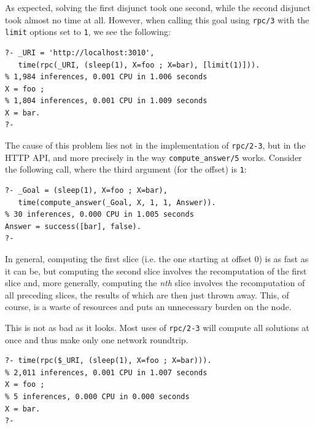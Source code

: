 \noindent As expected, solving the first disjunct took one second, while the second disjunct took almost no time at all. However, when calling this goal using \texttt{rpc/3} with the \texttt{limit} options set to \texttt{1}, we see the following:

\begin{verbatim}
?- _URI = 'http://localhost:3010',
   time(rpc(_URI, (sleep(1), X=foo ; X=bar), [limit(1)])).
% 1,984 inferences, 0.001 CPU in 1.006 seconds
X = foo ;
% 1,804 inferences, 0.001 CPU in 1.009 seconds
X = bar.
?- 
\end{verbatim}

\noindent The cause of this problem lies not in the implementation of \texttt{rpc/2-3}, but in the HTTP API, and more precisely in the way \texttt{compute\_answer/5} works. Consider the following call, where the third argument (for the offset) is \texttt{1}:

\begin{verbatim}
?- _Goal = (sleep(1), X=foo ; X=bar),
   time(compute_answer(_Goal, X, 1, 1, Answer)).
% 30 inferences, 0.000 CPU in 1.005 seconds
Answer = success([bar], false).
?-
\end{verbatim}



\noindent In general, computing the first slice (i.e. the one starting at offset 0) is as fast as it can be, but computing the second slice involves the recomputation of the first slice and, more generally, computing the \textit{nth} slice involves the recomputation of all preceding slices, the results of which are then just thrown away. This, of course, is a waste of resources and puts an unnecessary burden on the node.

This is not as bad as it looks. Most uses of \texttt{rpc/2-3} will compute all solutions at once and thus make only one network roundtrip. 

\begin{verbatim}
?- time(rpc($_URI, (sleep(1), X=foo ; X=bar))).
% 2,011 inferences, 0.001 CPU in 1.007 seconds
X = foo ;
% 5 inferences, 0.000 CPU in 0.000 seconds
X = bar.
?- 
\end{verbatim}

